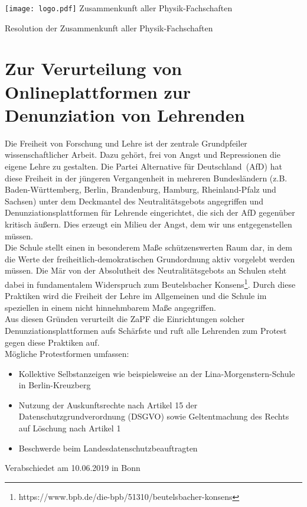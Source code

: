 ﻿\documentclass[DIV=calc]{scrartcl}
\begin{document}
\hspace{0.87\textwidth}
\begin{minipage}{120pt}
\vspace{-1.8cm}
\texttt{[image: logo.pdf]}
\centering
\small Zusammenkunft aller Physik-Fachschaften
\end{minipage}

\begin{center}
\huge{Resolution der Zusammenkunft aller Physik-Fachschaften}\vspace{.25\baselineskip}\\
\normalsize
\end{center}
\vspace{0.7cm}


\section*{Zur Verurteilung von Onlineplattformen zur Denunziation von Lehrenden}
Die Freiheit von Forschung und Lehre ist der zentrale Grundpfeiler wissenschaftlicher Arbeit. Dazu gehört, frei von Angst und Repressionen die eigene Lehre zu gestalten. Die Partei \glqq Alternative für Deutschland\grqq\ (AfD) hat diese Freiheit in der jüngeren Vergangenheit in mehreren Bundesländern (z.B. Baden-Württemberg, Berlin, Brandenburg, Hamburg, Rheinland-Pfalz und Sachsen) unter dem Deckmantel des Neutralitätsgebots angegriffen und Denunziationsplattformen für Lehrende eingerichtet, die sich der AfD gegenüber kritisch äußern.
Dies erzeugt ein Milieu der Angst, dem wir uns entgegenstellen müssen.\\
Die Schule stellt einen in besonderem Maße schützenswerten Raum dar, in dem die Werte der freiheitlich-demokratischen Grundordnung aktiv vorgelebt werden müssen. Die Mär von der Absolutheit des Neutralitätsgebots an Schulen steht dabei in fundamentalem Widerspruch zum Beutelsbacher Konsens\footnote{https://www.bpb.de/die-bpb/51310/beutelsbacher-konsens}. Durch diese Praktiken wird die Freiheit der Lehre im Allgemeinen und die Schule im speziellen in einem nicht hinnehmbarem Maße angegriffen.\\
Aus diesen Gründen verurteilt die ZaPF die Einrichtungen solcher Denunziationsplattformen aufs Schärfste und ruft alle Lehrenden zum Protest gegen diese Praktiken auf.\\
Mögliche Protestformen umfassen:
\begin{itemize}
\item Kollektive Selbstanzeigen wie beispielsweise an der Lina-Morgenstern-Schule in Berlin-Kreuzberg
\item Nutzung der Auskunftsrechte nach Artikel 15 der Datenschutzgrundverordnung (DSGVO) sowie Geltentmachung des Rechts auf Löschung nach Artikel 1
\item Beschwerde beim Landesdatenschutzbeauftragten
\end{itemize}

    

\vspace*{\fill}
\begin{flushright}
Verabschiedet am 10.06.2019 in Bonn
\end{flushright}
\end{document}
